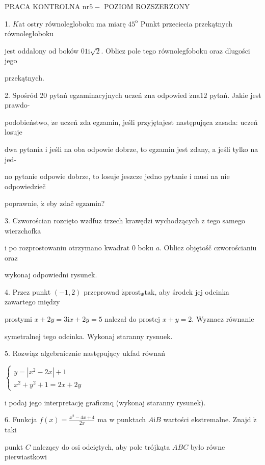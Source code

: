 \documentclass[a4paper,12pt]{article}
\begin{document}
PRACA KONTROLNA $\mathrm{n}\mathrm{r} 5-$ POZIOM ROZSZERZONY

1. $K\mathrm{a}\mathrm{t}$ ostry równolegloboku ma miarę $45^{\mathrm{o}}$ Punkt przeciecia przekątnych równoległoboku

jest oddalony od boków $0 1\mathrm{i}\sqrt{2}$. Oblicz pole tego równolegfoboku oraz dlugości jego

przekątnych.

2. Spośród 20 pytań egzaminacyjnych uczeń zna odpowied $\acute{\mathrm{z}}\mathrm{n}\mathrm{a}12$ pytań. Jakie jest prawdo-

podobieństwo, $\dot{\mathrm{z}}\mathrm{e}$ uczeń zda egzamin, jeśli przyjętajest następująca zasada: uczeń losuje

dwa pytania $\mathrm{i}$ jeśli na oba odpowie dobrze, to egzamin jest zdany, a jeśli tylko na jed-

no pytanie odpowie dobrze, to losuje jeszcze jedno pytanie $\mathrm{i}$ musi na nie odpowiedzieč

poprawnie, $\dot{\mathrm{z}}$ eby zdač egzamin?

3. Czworościan rozcięto wzdfuz trzech krawędzi wychodzących $\mathrm{z}$ tego samego wierzchofka

$\mathrm{i}$ po rozprostowaniu otrzymano kwadrat $0$ boku $a$. Oblicz objętośč czworościaniu oraz

wykonaj odpowiedni rysunek.

4. Przez punkt $(-1,2)$ przeprowad $\acute{\mathrm{z}} \mathrm{p}\mathrm{r}\mathrm{o}\mathrm{s}\mathrm{t}_{\Phi}\mathrm{t}\mathrm{a}\mathrm{k}$, aby środek jej odcinka zawartego między

prostymi $x+2y = 3\mathrm{i}x+2y = 5$ nalezał do prostej $x+y = 2$. Wyznacz równanie

symetralnej tego odcinka. Wykonaj staranny rysnuek.

5. Rozwiąz algebraicznie następujący ukfad równań

$\left\{\begin{array}{l}
y=|x^{2}-2x|+1\\
x^{2}+y^{2}+1=2x+2y
\end{array}\right.$

$\mathrm{i}$ podaj jego interpretację graficznq (wykonaj staranny rysunek).

6. Funkcja $f(x) = \displaystyle \frac{x^{2}-4x+4}{2x}$ ma $\mathrm{w}$ punktach $A\mathrm{i}B$ wartości ekstremalne. Znajd $\acute{\mathrm{z}}$ taki

punkt $C$ nalezący do osi odciętych, aby pole trójkąta $ABC$ było równe pierwiastkowi
\end{document}
